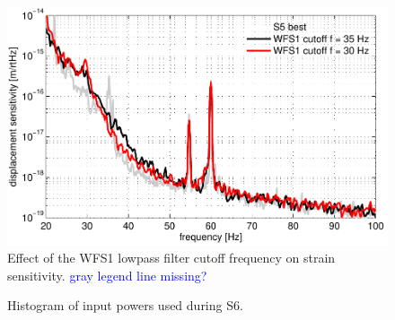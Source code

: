 \begin{figure}
\begin{centering}
\includegraphics[width=1.0\textwidth]{figures/cutoffWFS1_DARMcompare.pdf}
\caption[Effect of the WFS1 lowpass filter cutoff frequency on strain
sensitivity.]{Effect of the WFS1 lowpass filter cutoff frequency on
  strain sensitivity. \textcolor{blue}{gray legend line missing?}}
\label{fig:WFS1cutoff}
\end{centering}
\end{figure}





\begin{figure}
\begin{centering}
\caption[Histogram of input powers used during S6]{Histogram of input
  powers used during S6.}
\label{fig:}
\end{centering}
\end{figure}



